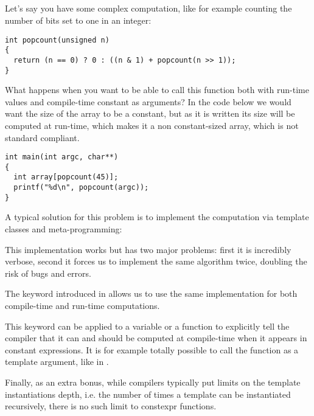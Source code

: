 \subsection{}

Let's say you have some complex computation, like for example counting
the number of bits set to one in an integer:

\begin{lstlisting}
int popcount(unsigned n)
{
  return (n == 0) ? 0 : ((n & 1) + popcount(n >> 1));
}
\end{lstlisting}

What happens when you want to be able to call this function both with
run-time values and compile-time constant as arguments? In the code
below we would want the size of the array to be a constant, but as it
is written its size will be computed at run-time, which makes it a non
constant-sized array, which is not standard compliant.

\begin{lstlisting}
int main(int argc, char**)
{
  int array[popcount(45)];
  printf("%d\n", popcount(argc));
}
\end{lstlisting}

A typical solution for this problem is to implement the computation
via template classes and meta-programming:


This implementation works but has two major problems: first it is
incredibly verbose, second it forces us to implement the same
algorithm twice, doubling the risk of bugs and errors.

\bigskip

The  keyword introduced in  allows us to use the
same implementation for both compile-time and run-time computations.


This keyword can be applied to a variable or a function to explicitly
tell the compiler that it can and should be computed at compile-time
when it appears in constant expressions. It is for example totally
possible to call the  function as a
template argument, like in .

Finally, as an extra bonus, while compilers typically put limits on
the template instantiations depth, i.e. the number of times a template
can be instantiated recursively, there is no such limit to
constexpr functions.
